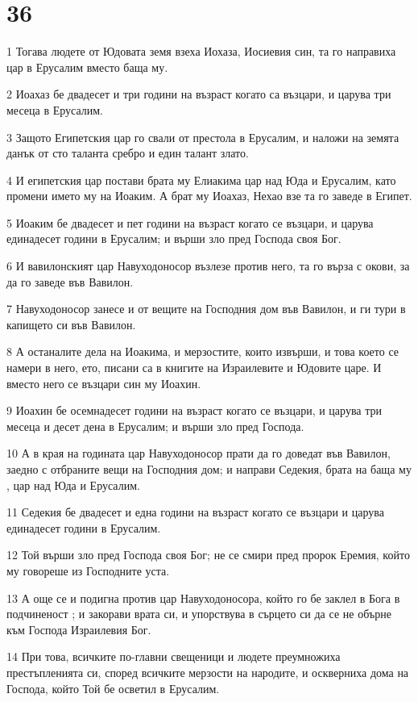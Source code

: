 \chapter{36}

\par 1 Тогава людете от Юдовата земя взеха Иохаза, Иосиевия син, та го направиха цар в Ерусалим вместо баща му.
\par 2 Иоахаз бе двадесет и три години на възраст когато са възцари, и царува три месеца в Ерусалим.
\par 3 Защото Египетския цар го свали от престола в Ерусалим, и наложи на земята данък от сто таланта сребро и един талант злато.
\par 4 И египетския цар постави брата му Елиакима цар над Юда и Ерусалим, като промени името му на Иоаким. А брат му Иоахаз, Нехао взе та го заведе в Египет.
\par 5 Иоаким бе двадесет и пет години на възраст когато се възцари, и царува единадесет години в Ерусалим; и върши зло пред Господа своя Бог.
\par 6 И вавилонският цар Навуходоносор възлезе против него, та го върза с окови, за да го заведе във Вавилон.
\par 7 Навуходоносор занесе и от вещите на Господния дом във Вавилон, и ги тури в капището си във Вавилон.
\par 8 А останалите дела на Иоакима, и мерзостите, които извърши, и това което се намери в него, ето, писани са в книгите на Израилевите и Юдовите царе. И вместо него се възцари син му Иоахин.
\par 9 Иоахин бе осемнадесет години на възраст когато се възцари, и царува три месеца и десет дена в Ерусалим; и върши зло пред Господа.
\par 10 А в края на годината цар Навуходоносор прати да го доведат във Вавилон, заедно с отбраните вещи на Господния дом; и направи Седекия, брата на баща му , цар над Юда и Ерусалим.
\par 11 Седекия бе двадесет и една години на възраст когато се възцари и царува единадесет години в Ерусалим.
\par 12 Той върши зло пред Господа своя Бог; не се смири пред пророк Еремия, който му говореше из Господните уста.
\par 13 А още се и подигна против цар Навуходоносора, който го бе заклел в Бога в подчиненост ; и закорави врата си, и упорствува в сърцето си да се не обърне към Господа Израилевия Бог.
\par 14 При това, всичките по-главни свещеници и людете преумножиха престъпленията си, според всичките мерзости на народите, и оскверниха дома на Господа, който Той бе осветил в Ерусалим.
